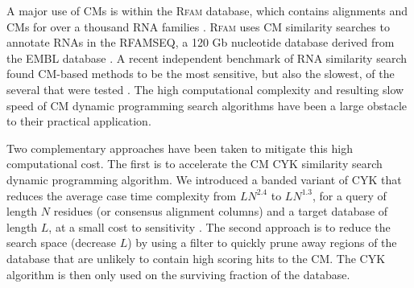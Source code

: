 A major use of CMs is within the \textsc{Rfam} database, which
contains alignments and CMs for over a thousand RNA families
\citep{Gardner09}.  \textsc{Rfam} uses CM similarity searches to
annotate RNAs in the RFAMSEQ, a 120 Gb nucleotide database derived
from the EMBL database \citep{Cochran08}.  A recent independent
benchmark of RNA similarity search found CM-based methods to be the
most sensitive, but also the slowest, of the several that were tested
\citep{Freyhult07}.  The high computational complexity and resulting
slow speed of CM dynamic programming search algorithms have been a
large obstacle to their practical application.

\begin{comment}
RNAs conserve sequence and structural features that are important to
their function. Computational tools for detecting and aligning
structural RNAs have benefitted from modelling both types of
conservation. These tools can be organized into two classes: those
that are specific to a single RNA family, and general ones that can be
used for any family. The former class includes programs for detecting
tRNAs, SRP RNA, tmRNA, snoRNAs, microRNAs, rho-independent terminators
and others. The general class of tools includes pattern matching
programs and probabilistic profile based methods, including the
'covariance model' (CM), a particular profile stochastic context-free
grammar formulation. In a recent benchmark of RNA similarity search, CM
methods were found to be the most sensitive of those tested, but also
the slowest. The computational complexity, and resulting slow speed of
CM methods have been a large obstacle to their practical application.
\end{comment}

Two complementary approaches have been taken to mitigate this high
computational cost.  The first is to accelerate the CM CYK similarity
search dynamic programming algorithm. We introduced a banded variant
of CYK that reduces the average case time complexity from $LN^{2.4}$
to $LN^{1.3}$, for a query of length $N$ residues (or consensus
alignment columns) and a target database of length $L$, at a small
cost to sensitivity \citep{NawrockiEddy07}. The second approach is to
reduce the search space (decrease $L$) by using a filter to quickly
prune away regions of the database that are unlikely to contain high
scoring hits to the CM. The CYK algorithm is then only used on the
surviving fraction of the database.

